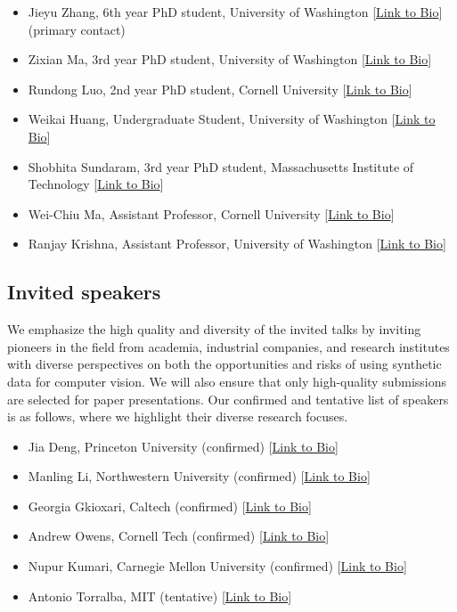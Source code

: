 \documentclass{article}
\begin{document}
\begin{itemize}
    \item Jieyu Zhang, 6th year PhD student, University of Washington [\href{https://jieyuz2.github.io/}{Link to Bio}] (primary contact)
    \item Zixian Ma, 3rd year PhD student, University of Washington [\href{https://zixianma.github.io/}{Link to Bio}]
    \item Rundong Luo, 2nd year PhD student, Cornell University [\href{https://red-fairy.github.io/}{Link to Bio}]
    \item Weikai Huang, Undergraduate Student, University of Washington [\href{https://weikaih04.github.io/}{Link to Bio}]
    \item Shobhita Sundaram, 3rd year PhD student, Massachusetts Institute of Technology [\href{https://ssundaram21.github.io/}{Link to Bio}]
    \item Wei-Chiu Ma, Assistant Professor, Cornell University [\href{https://people.csail.mit.edu/weichium/}{Link to Bio}]
    \item Ranjay Krishna, Assistant Professor, University of Washington [\href{https://ranjaykrishna.com/index.html}{Link to Bio}]
\end{itemize}



\subsection{Invited speakers}
We emphasize the high quality and diversity of the invited talks by inviting pioneers in the field from academia, industrial companies, and research institutes with diverse perspectives on both the opportunities and risks of using synthetic data for computer vision. We will also ensure that only high-quality submissions are selected for paper presentations. Our confirmed and tentative list of speakers is as follows, where we highlight their diverse research focuses.
\begin{itemize}
        \item Jia Deng, Princeton University (confirmed) [\href{https://www.cs.princeton.edu/~jiadeng/}{Link to Bio}]
        \item Manling Li, Northwestern University (confirmed) [\href{https://limanling.github.io/}{Link to Bio}]
        \item Georgia Gkioxari, Caltech (confirmed) [\href{https://www.cms.caltech.edu/people/georgia-gkioxari}{Link to Bio}]
        \item Andrew Owens, Cornell Tech (confirmed) [\href{https://andrewowens.com/}{Link to Bio}]
        \item Nupur Kumari, Carnegie Mellon University (confirmed) [\href{https://nupurkmr9.github.io/}{Link to Bio}]
        \item Antonio Torralba, MIT (tentative) [\href{http://web.mit.edu/torralba/www/}{Link to Bio}]
\end{itemize}
\end{document}
